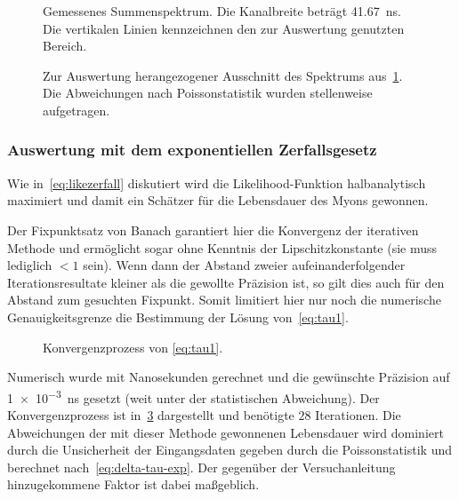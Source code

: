 \documentclass[slug=LM, room=Andreas-Schubert-Bau\,\ K\ 1A, supervisor=Anne-Sophie\ Berthold, coursedate=13.\ 12.\ 2019]{../../Lab_Report_LaTeX/lab_report}
\begin{document}
\begin{figure}[h]\centering
  
  \caption[Gemessenes Summenspektrum Hauptversuch]{Gemessenes Summenspektrum. Die Kanalbreite betr\"agt
    \SI{41.67}{\nano\second}. Die vertikalen Linien kennzeichnen den
    zur Auswertung genutzten Bereich.}
  \label{fig:haupt-spectrum_overview}
\end{figure}
\begin{figure}[h]\centering
  
  \caption[Detailansicht des gemessenen Spektrums]{Zur Auswertung
    herangezogener Ausschnitt des Spektrums
    aus~\ref{fig:haupt-spectrum_overview}. Die Abweichungen nach
    Poissonstatistik wurden stellenweise aufgetragen.}
  \label{fig:haupt-spectrum_detail}
\end{figure}

\subsubsection{Auswertung mit dem exponentiellen Zerfallsgesetz}
\label{sec:auswertung-mit-dem-1}

Wie in~\ref{eq:likezerfall} diskutiert wird die Likelihood-Funktion
halbanalytisch maximiert und damit ein Sch\"atzer f\"ur die
Lebensdauer des Myons gewonnen.

Der Fixpunktsatz von Banach garantiert hier die Konvergenz der
iterativen Methode und erm\"oglicht sogar ohne Kenntnis der
Lipschitzkonstante (sie muss lediglich \(< 1\) sein). Wenn dann der
Abstand zweier aufeinanderfolgender Iterationsresultate kleiner als
die gewollte Pr\"azision ist, so gilt dies auch f\"ur den Abstand zum
gesuchten Fixpunkt. Somit limitiert hier nur noch die numerische
Genauigkeitsgrenze die Bestimmung der L\"osung von~\ref{eq:tau1}.

\begin{figure}[h]\centering
  
  \caption{Konvergenzprozess von \ref{eq:tau1}.}
  \label{fig:haupt-continous}
\end{figure}

Numerisch wurde mit Nanosekunden gerechnet und die gew\"unschte
Pr\"azision auf \SI{1e-3}{\nano\second} gesetzt (weit unter der
statistischen Abweichung). Der Konvergenzprozess
ist in~\ref{fig:haupt-continous} dargestellt und ben\"otigte \(28\)
Iterationen. Die Abweichungen der mit dieser Methode gewonnenen
Lebensdauer wird dominiert durch die Unsicherheit der Eingangsdaten
gegeben durch die Poissonstatistik und berechnet
nach~\ref{eq:delta-tau-exp}. Der gegen\"uber der Versuchanleitung
hinzugekommene Faktor ist dabei ma\ss{}geblich.
\end{document}

